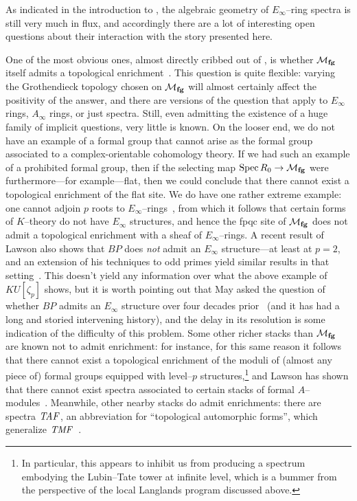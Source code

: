 As indicated in the introduction to , the algebraic geometry of \(E_\infty\)--ring spectra is still very much in flux, and accordingly there are a lot of interesting open questions about their interaction with the story presented here.

One of the most obvious ones, almost directly cribbed out of , is whether \(\mathcal{M}_{\mathbf{fg}}\) itself admits a topological enrichment~\cite{GoerssRealizingFamilies}.  This question is quite flexible: varying the Grothendieck topology chosen on \(\mathcal{M}_{\mathbf{fg}}\) will almost certainly affect the positivity of the answer, and there are versions of the question that apply to \(E_\infty\) rings, \(A_\infty\) rings, or just spectra.  Still, even admitting the existence of a huge family of implicit questions, very little is known.  On the looser end, we do not have an example of a formal group that cannot arise as the formal group associated to a complex-orientable cohomology theory.  If we had such an example of a prohibited formal group, then if the selecting map \(\operatorname{Spec} R_0 \to \mathcal{M}_{\mathbf{fg}}\) were furthermore---for example---flat, then we could conclude that there cannot exist a topological enrichment of the flat site.  We do have one rather extreme example: one cannot adjoin \(p\){\th} roots to \(E_\infty\)--rings~\cite{SchwaenzlRolandVogt,Devalapurkar}, from which it follows that certain forms of \(K\)--theory do not have \(E_\infty\) structures, and hence the fpqc site of \(\mathcal{M}_{\mathbf{fg}}\) does not admit a topological enrichment with a sheaf of \(E_\infty\)--rings.  A recent result of Lawson also shows that \(BP\) does \emph{not} admit an \(E_\infty\) structure---at least at \(p = 2\), and an extension of his techniques to odd primes yield similar results in that setting~\cite{LawsonSecondaryPowerOps,Senger}.  This doesn't yield any information over what the above example of \(KU[\zeta_p]\) shows, but it is worth pointing out that May asked the question of whether \(BP\) admits an \(E_\infty\) structure over four decades prior~\cite{MayProblemsInLoopspaceTheory} (and it has had a long and storied intervening history), and the delay in its resolution is some indication of the difficulty of this problem.  Some other richer stacks than \(\mathcal{M}_{\mathbf{fg}}\) are known not to admit enrichment: for instance, for this same reason it follows that there cannot exist a topological enrichment of the moduli of (almost any piece of) formal groups equipped with level--\(p\) structures,\footnote{In particular, this appears to inhibit us from producing a spectrum embodying the Lubin--Tate tower at infinite level, which is a bummer from the perspective of the local Langlands program discussed above.} and Lawson has shown that there cannot exist spectra associated to certain stacks of formal \(A\)--modules~\cite{LawsonRealizability}.  Meanwhile, other nearby stacks do admit enrichments: there are spectra \(\mathit{TAF}\), an abbreviation for ``topological automorphic forms'', which generalize \(\mathit{TMF}\)~\cite{BehrensLawson}.

